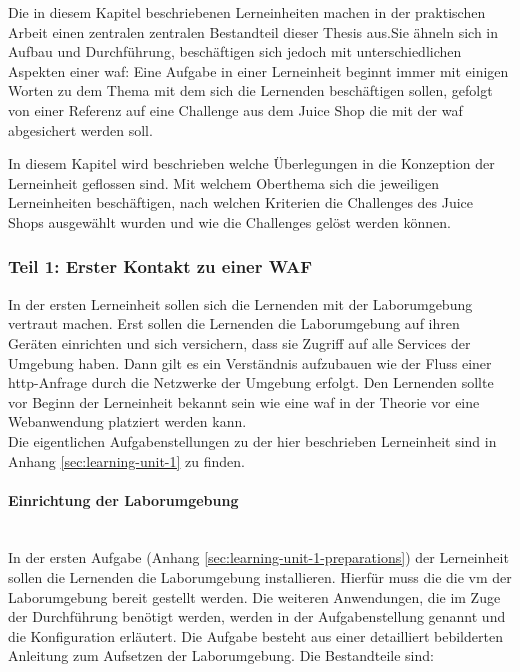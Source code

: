 Die in diesem Kapitel beschriebenen Lerneinheiten machen in der praktischen Arbeit einen zentralen zentralen Bestandteil dieser Thesis aus.Sie ähneln sich in Aufbau und Durchführung, beschäftigen sich jedoch mit unterschiedlichen Aspekten einer \ac{waf}:
Eine Aufgabe in einer Lerneinheit beginnt immer mit einigen Worten zu dem Thema mit dem sich die Lernenden beschäftigen sollen, gefolgt von einer Referenz auf eine Challenge aus dem Juice Shop die mit der \ac{waf} abgesichert werden soll.

In diesem Kapitel wird beschrieben welche Überlegungen in die Konzeption der Lerneinheit geflossen sind.
Mit welchem Oberthema sich die jeweiligen Lerneinheiten beschäftigen, nach welchen Kriterien die Challenges des Juice Shops ausgewählt wurden und wie die Challenges gelöst werden können.

\subsubsection{Teil 1: Erster Kontakt zu einer WAF}
\label{sec:learning-unit-1-meta}

In der ersten Lerneinheit sollen sich die Lernenden mit der Laborumgebung vertraut machen.
Erst sollen die Lernenden die Laborumgebung auf ihren Geräten einrichten und sich versichern, dass sie Zugriff auf alle Services der Umgebung haben.
Dann gilt es ein Verständnis aufzubauen wie der Fluss einer \ac{http}-Anfrage durch die Netzwerke der Umgebung erfolgt.
Den Lernenden sollte vor Beginn der Lerneinheit bekannt sein wie eine \ac{waf} in der Theorie vor eine Webanwendung platziert werden kann.\\

Die eigentlichen Aufgabenstellungen zu der hier beschrieben Lerneinheit sind in Anhang \ref{sec:learning-unit-1} zu finden.\\

\paragraph{Einrichtung der Laborumgebung}\ \\

In der ersten Aufgabe (Anhang \ref{sec:learning-unit-1-preparations}) der Lerneinheit sollen die Lernenden die Laborumgebung installieren.
Hierfür muss die die \ac{vm} der Laborumgebung bereit gestellt werden.
Die weiteren Anwendungen, die im Zuge der Durchführung benötigt werden, werden in der Aufgabenstellung genannt und die Konfiguration erläutert.
Die Aufgabe besteht aus einer detailliert bebilderten Anleitung zum Aufsetzen der Laborumgebung.
Die Bestandteile sind:

